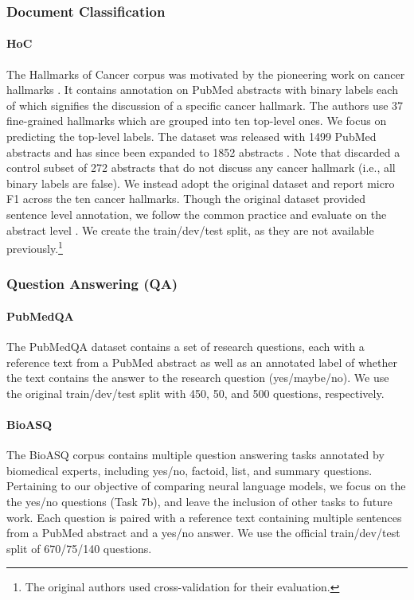 \documentclass[acmlarge,screen,nonacm]{acmart}
\begin{document}
\subsubsection{Document Classification}

\paragraph{HoC} The Hallmarks of Cancer corpus was motivated by the pioneering work on cancer hallmarks \cite{hanahan2000hallmarks}. It contains annotation on PubMed abstracts with binary labels each of which signifies the discussion of a specific cancer hallmark. The authors use 37 fine-grained hallmarks which are grouped into ten top-level ones. We focus on predicting the top-level labels.
The dataset was released with 1499 PubMed abstracts \cite{baker2015automatic} and has since been expanded to 1852 abstracts \cite{baker2017cancer}. Note that \citet{peng2019transfer} discarded a control subset of 272 abstracts that do not discuss any cancer hallmark (i.e., all binary labels are false). We instead adopt the original dataset and report micro F1 across the ten cancer hallmarks. Though the original dataset provided sentence level annotation, we follow the common practice and evaluate on the abstract level \cite{6471714, 10.1093/jamia/ocz085}. We create the train/dev/test split, as they are not available previously.\footnote{The original authors used cross-validation for their evaluation.}

\subsubsection{Question Answering (QA)}

\paragraph{PubMedQA} The PubMedQA dataset \cite{jin2019PubMedqa} contains a set of research questions, each with a reference text from a PubMed abstract as well as an annotated label of whether the text contains the answer to the research question (yes/maybe/no). We use the original train/dev/test split with 450, 50, and 500 questions, respectively.

\paragraph{BioASQ} The BioASQ corpus \cite{nentidis2019results} contains multiple question answering tasks annotated by biomedical experts, including yes/no, factoid, list, and summary questions. 
Pertaining to our objective of comparing neural language models, we focus on the the yes/no questions (Task 7b), and leave the inclusion of other tasks to future work. Each question is paired with a reference text containing multiple sentences from a PubMed abstract and a yes/no answer. 
We use the official train/dev/test split of 670/75/140 questions.
\end{document}
